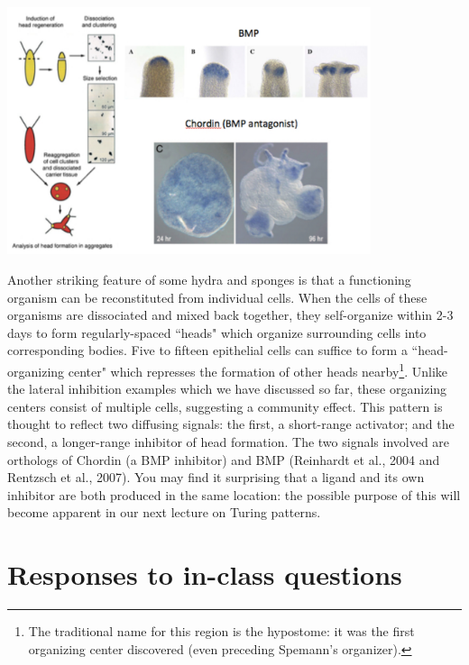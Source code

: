 \documentclass{article}
\begin{document}
\begin{center}
\includegraphics[width=0.8\textwidth]{reconstituion.pdf}
\end{center}

Another striking feature of some hydra and sponges is that a functioning organism can be reconstituted from individual cells. When the cells of these organisms are dissociated and mixed back together, they self-organize within 2-3 days to form regularly-spaced ``heads" which organize surrounding cells into corresponding bodies. Five to fifteen epithelial cells can suffice to form a ``head-organizing center" which represses the formation of other heads nearby\footnote{The traditional name for this region is the hypostome: it was the first organizing center discovered (even preceding Spemann's organizer).}. Unlike the lateral inhibition examples which we have discussed so far, these organizing centers consist of multiple cells, suggesting a community effect. This pattern is thought to reflect two diffusing signals: the first, a short-range activator; and the second, a longer-range inhibitor of head formation. The two signals involved are orthologs of Chordin (a BMP inhibitor) and BMP (Reinhardt et al., 2004 and Rentzsch et al., 2007). You may find it surprising that a ligand and its own inhibitor are both produced in the same location: the possible purpose of this will become apparent in our next lecture on Turing patterns.

\section*{Responses to in-class questions}
\end{document}
